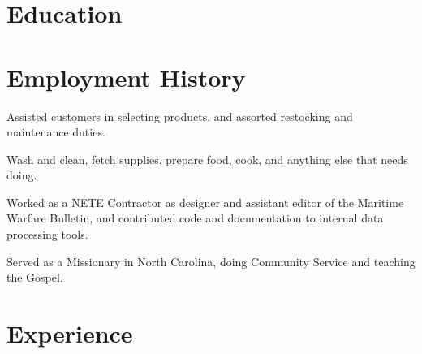\documentclass[letterpaper]{resume}
\author{Andrew C. Puddington}
\begin{document}
\maketitle

\section{Education}

	
\section{Employment History}

	\begin{description}
		\item Assisted customers in selecting products, and assorted restocking and maintenance duties.
	\end{description} 

	\begin{description}
		\item Wash and clean, fetch supplies, prepare food, cook, and anything else that needs doing.
	\end{description}
	
	\begin{description}
		\item Worked as a NETE Contractor as designer and assistant editor of the Maritime Warfare Bulletin, and contributed code and documentation to internal data processing tools.
	\end{description}

	\begin{description}
		\item Served as a Missionary in North Carolina, doing Community Service and teaching the Gospel.
	\end{description}

\section{Experience}
	
\end{document}

